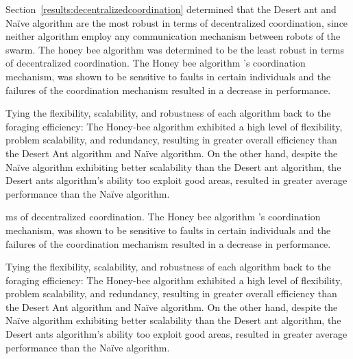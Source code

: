 Section~\ref{results:decentralizedcoordination} determined that the Desert ant and Na\"ive algorithm are the most robust in terms of decentralized coordination, since neither algorithm employ any communication mechanism between robots of the swarm. The honey bee algorithm was determined to be the least robust in terms of decentralized coordination. The Honey bee algorithm 's coordination mechanism, was shown to be sensitive to faults in certain individuals and the failures of the coordination mechanism resulted in a decrease in performance.

Tying the flexibility, scalability, and robustness of each algorithm back to the foraging efficiency: The Honey-bee algorithm exhibited a high level of flexibility, problem scalability, and redundancy, resulting in greater overall efficiency than the Desert Ant algorithm and Na\"ive algorithm. On the other hand, despite the Na\"ive algorithm exhibiting better scalability than the Desert ant algorithm, the Desert ants algorithm's ability too exploit good areas, resulted in greater average performance than the Na\"ive algorithm.

ms of decentralized coordination. The Honey bee algorithm 's coordination mechanism, was shown to be sensitive to faults in certain individuals and the failures of the coordination mechanism resulted in a decrease in performance.

Tying the flexibility, scalability, and robustness of each algorithm back to the foraging efficiency: The Honey-bee algorithm exhibited a high level of flexibility, problem scalability, and redundancy, resulting in greater overall efficiency than the Desert Ant algorithm and Na\"ive algorithm. On the other hand, despite the Na\"ive algorithm exhibiting better scalability than the Desert ant algorithm, the Desert ants algorithm's ability too exploit good areas, resulted in greater average performance than the Na\"ive algorithm.

